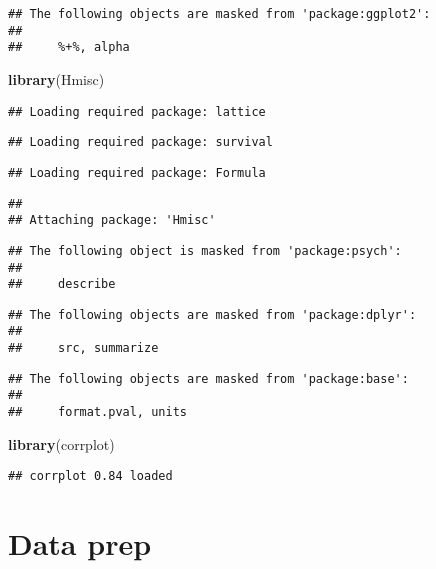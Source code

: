 \documentclass[]{article}
\newenvironment{Shaded}{\begin{snugshade}}{\end{snugshade}}
\newcommand{\KeywordTok}[1]{\textcolor[rgb]{0.13,0.29,0.53}{\textbf{#1}}}
\newcommand{\NormalTok}[1]{#1}
\begin{document}
\begin{verbatim}
## The following objects are masked from 'package:ggplot2':
## 
##     %+%, alpha
\end{verbatim}

\begin{Shaded}
\begin{Highlighting}[]
\KeywordTok{library}\NormalTok{(Hmisc)}
\end{Highlighting}
\end{Shaded}

\begin{verbatim}
## Loading required package: lattice
\end{verbatim}

\begin{verbatim}
## Loading required package: survival
\end{verbatim}

\begin{verbatim}
## Loading required package: Formula
\end{verbatim}

\begin{verbatim}
## 
## Attaching package: 'Hmisc'
\end{verbatim}

\begin{verbatim}
## The following object is masked from 'package:psych':
## 
##     describe
\end{verbatim}

\begin{verbatim}
## The following objects are masked from 'package:dplyr':
## 
##     src, summarize
\end{verbatim}

\begin{verbatim}
## The following objects are masked from 'package:base':
## 
##     format.pval, units
\end{verbatim}

\begin{Shaded}
\begin{Highlighting}[]
\KeywordTok{library}\NormalTok{(corrplot)}
\end{Highlighting}
\end{Shaded}

\begin{verbatim}
## corrplot 0.84 loaded
\end{verbatim}

\hypertarget{data-prep}{%
\section{Data prep}\label{data-prep}}
\end{document}
